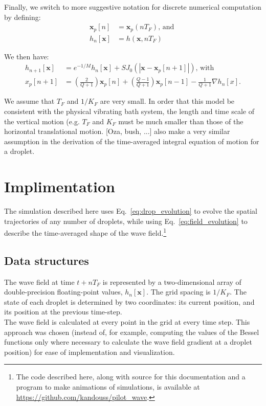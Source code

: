 \documentclass{article}
\newcommand{\x}{\mathbf{x}}
\begin{document}
Finally, we switch to more suggestive notation for discrete numerical computation by defining:
\begin{align}
	\x_p[n] &= \x_p(n T_F) \text{, and }\\
	h_n[\x] &= h(\x,n T_F)
\end{align}

We then have:
\begin{align}
	h_{n+1}[\x] &= e^{-1/M} h_n[\x] + S J_{0}(|\x - \x_p[n+1]|) \text{, with } \label{eq:field_evolution}\\
	x_p[n+1] &= \left( \frac{2}{Q+1} \right) \x_p[n] + \left( \frac{Q-1}{Q+1} \right) \x_p[n-1] - \frac{1}{Q+1} \nabla h_{n}[x]\label{eq:drop_evolution}.
\end{align}

We assume that $T_{F}$ and $1/K_{F}$ are very small. In order that this model be consistent with the physical vibrating bath system, the length and time scale of the vertical motion (e.g. $T_{F}$ and $K_{F}$ must be much smaller than those of the horizontal translational motion. 
[Oza, bush, ...] also make a very similar assumption in the derivation of the time-averaged integral equation of motion for a droplet.

\section{Implimentation}
The simulation described here uses Eq.~\ref{eq:drop_evolution} to evolve the spatial trajectories of any number of droplets, while using Eq.~\ref{eq:field_evolution} to describe the time-averaged shape of the wave field.\footnote{The code described here, along with source for this documentation and a program to make animations of simulations, is available at \url{https://github.com/kandouss/pilot_wave}.}

\subsection{Data structures}
The wave field at time $t+n T_{F}$ is represented by a two-dimensional array of double-precision floating-point values, $h_{n}[\x]$. The grid spacing is $1/K_{F}$.
The state of each droplet is determined by two coordinates: its current position, and its position at the previous time-step.\\

The wave field is calculated at every point in the grid at every time step. This approach was chosen (instead of, for example, computing the values of the Bessel functions only where necessary to calculate the wave field gradient at a droplet position) for ease of implementation and visualization.
\end{document}
